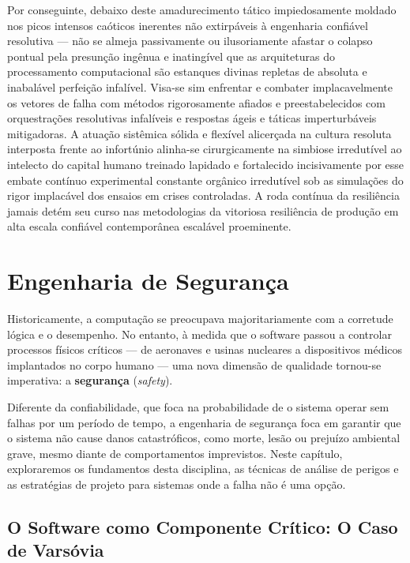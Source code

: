 \documentclass[12pt,a4paper,twoside]{report}
\begin{document}
Por conseguinte, debaixo deste amadurecimento tático impiedosamente moldado nos picos intensos caóticos inerentes não extirpáveis à engenharia confiável resolutiva — não se almeja passivamente ou ilusoriamente afastar o colapso pontual pela presunção ingênua e inatingível que as arquiteturas do processamento computacional são estanques divinas repletas de absoluta e inabalável perfeição infalível. Visa-se sim enfrentar e combater implacavelmente os vetores de falha com métodos rigorosamente afiados e preestabelecidos com orquestrações resolutivas infalíveis e respostas ágeis e táticas imperturbáveis mitigadoras. A atuação sistêmica sólida e flexível alicerçada na cultura resoluta interposta frente ao infortúnio alinha-se cirurgicamente na simbiose irredutível ao intelecto do capital humano treinado lapidado e fortalecido incisivamente por esse embate contínuo experimental constante orgânico irredutível sob as simulações do rigor implacável dos ensaios em crises controladas. A roda contínua da resiliência jamais detém seu curso nas metodologias da vitoriosa resiliência de produção em alta escala confiável contemporânea escalável proeminente.


\chapter{Engenharia de Segurança}

Historicamente, a computação se preocupava majoritariamente com a corretude lógica e o desempenho. No entanto, à medida que o software passou a controlar processos físicos críticos — de aeronaves e usinas nucleares a dispositivos médicos implantados no corpo humano — uma nova dimensão de qualidade tornou-se imperativa: a \textbf{segurança} (\emph{safety}).

Diferente da confiabilidade, que foca na probabilidade de o sistema operar sem falhas por um período de tempo, a engenharia de segurança foca em garantir que o sistema não cause danos catastróficos, como morte, lesão ou prejuízo ambiental grave, mesmo diante de comportamentos imprevistos. Neste capítulo, exploraremos os fundamentos desta disciplina, as técnicas de análise de perigos e as estratégias de projeto para sistemas onde a falha não é uma opção.

\section{O Software como Componente Crítico: O Caso de Varsóvia}
\end{document}
